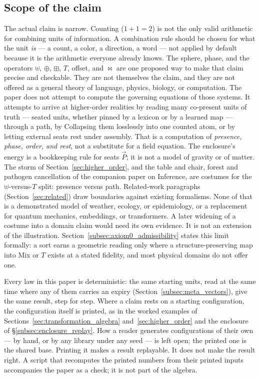 \documentclass[12pt, a4paper]{article}
\begin{document}
\subsection{Scope of the claim}
\label{subsec:claim_scope}
The actual claim is narrow. Counting ($1+1=2$) is not the only valid
arithmetic for combining units of information. A combination rule
should be chosen for what the unit \emph{is} --- a count, a color, a
direction, a word --- not applied by default because it is the
arithmetic everyone already knows. The sphere, phase, and the
operators $\uplus$, $\oplus$, $\boxplus$, $T$, offset, and $\bowtie$ are one
proposed way to make that claim precise and checkable. They are not
themselves the claim, and they are not offered as a general theory of
language, physics, biology, or computation.
The paper does not attempt to compute the governing equations of
those systems. It attempts to arrive at higher-order realities by
reading many co-present units of truth --- seated units, whether
pinned by a lexicon or by a learned map --- through a path, by
Collapsing them losslessly into one counted atom, or by letting
external seats rest under assembly. That is a computation of
\emph{presence, phase, order, and rest}, not a substitute for a field
equation. The enclosure's energy is a bookkeeping rule for seats
$\vec P$; it is not a model of gravity or of matter.
The storm of Section~\ref{sec:higher_order}, and the table and chair, forest and pathogen cancellation of the companion paper on Inference, are costumes for the
$\uplus$-versus-$T$ split: presence versus path. Related-work
paragraphs (Section~\ref{sec:related}) draw boundaries against
existing formalisms. None of that is a demonstrated model of weather,
ecology, or epidemiology, or a replacement for quantum mechanics,
embeddings, or transformers. A later widening of a costume into a
domain claim would need its own evidence. It is not an extension of
the illustration.
Section~\ref{subsec:axiom0_admissibility} states this limit formally:
a sort earns a geometric reading only where a structure-preserving
map into Mix or $T$ exists at a stated fidelity, and most physical
domains do not offer one.

Every law in this paper is deterministic: the same starting units,
read at the same time where any of them carries an expiry
(Section~\ref{subsec:meta_vectors}), give the same result, step for
step. Where a claim rests on a
starting configuration, the configuration itself is printed, as in
the worked examples of Sections~\ref{sec:transformation_algebra}
and~\ref{sec:higher_order} and the enclosure of
\S\ref{subsec:enclosure_replay}. How a reader generates
configurations of their own --- by hand, or by any library under any
seed --- is left open; the printed one is the shared base. Printing it makes a result replayable. It does not make the result right. A script that recomputes the printed numbers from their printed inputs accompanies the paper as a check; it is not part of the algebra.
\end{document}
